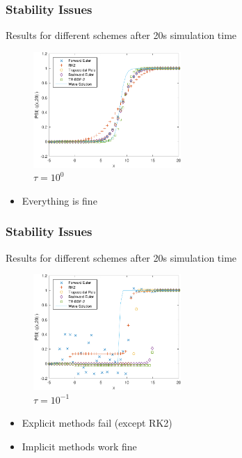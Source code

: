\begin{frame}{}
    \frametitle{Stability Issues}
    Results for different schemes after 20s simulation time
    \begin{multicols}{3}
        \begin{figure}
            \centering
            \includegraphics[width=0.5\textwidth]{figures/tau1e0.pdf}
            \caption{$\tau=10^{0}$}
        \end{figure}{}
        \vfill\null
        \columnbreak
        \begin{itemize}
            \item Everything is fine \\
        \end{itemize}{}
        \vfill\null
        \columnbreak
    \end{multicols}
\end{frame}{}




\begin{frame}{}
    \frametitle{Stability Issues}
    Results for different schemes after 20s simulation time
    \begin{multicols}{2}
         \begin{figure}
            \centering
            \includegraphics[width=0.5\textwidth]{figures/tau1e-1.pdf}
            \caption{$\tau=10^{-1}$}
        \end{figure}{}
         \vfill\null
        \columnbreak
       \begin{itemize}
            \item Explicit methods fail (except RK2) \\
            \item Implicit methods work fine \\
        \end{itemize}{}
        \vfill\null
        \columnbreak
    \end{multicols}
\end{frame}{}




